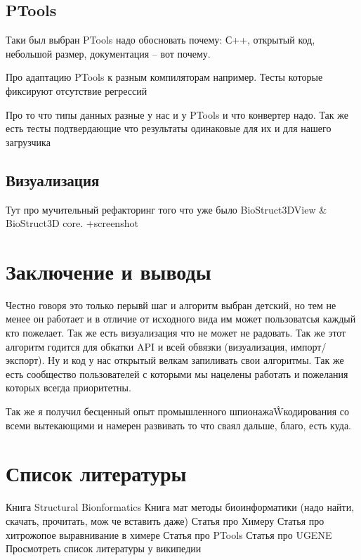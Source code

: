 \documentclass[a4paper, 12pt, titlepage, utf8]{extarticle}
\begin{document}
\subsection{PTools}
Таки был выбран PTools надо обосновать почему: С++, открытый код, небольшой размер, документация -- вот почему.

Про адаптацию PTools к разным компиляторам например.
Тесты которые фиксируют отсутствие регрессий

Про то что типы данных разные у нас и у PTools и что конвертер надо.
Так же есть тесты подтвердающие что результаты одинаковые для их и для нашего загрузчика

\subsection{Визуализация}
Тут про мучительный рефакторинг того что уже было BioStruct3DView \& BioStruct3D core.
+screenshot


\section{Заключение и выводы}

Честно говоря это только перывй шаг и алгоритм выбран детский, но тем не менее он работает и в отличие от исходного вида им может пользоватсья каждый кто пожелает. Так же есть визуализация что не может не радовать. Так же этот алгоритм годится для обкатки API и всей обвязки (визуализация, импорт/экспорт). Ну и код у нас открытый велкам запиливать свои алгоритмы. Так же есть сообщество пользователей с которыми мы нацелены работать и пожелания которых всегда приоритетны. 

Так же я получил бесценный опыт промышленного шпионажа\^Wкодирования со всеми вытекающими и намерен развивать то что сваял дальше, благо, есть куда.

\section{Список литературы}

Книга Structural Bionformatics
Книга мат методы биоинформатики (надо найти, скачать, прочитать, мож че вставить даже)
Статья про Химеру
Статья про хитрожопое выравнивание в химере
Статья про PTools
Статья про UGENE
Просмотреть список литературы у википедии
\end{document}
